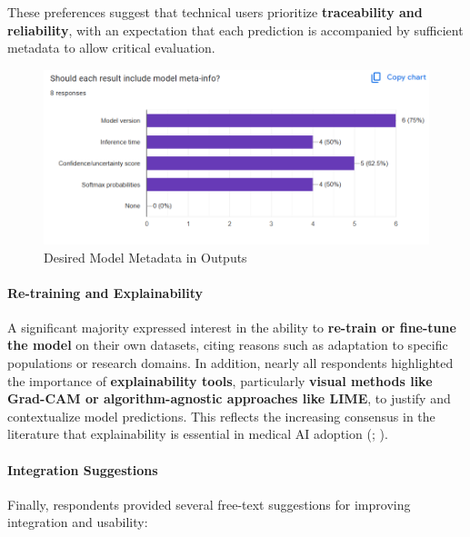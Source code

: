 \documentclass[
  12pt,
  oneside]{article}
\begin{document}
These preferences suggest that technical users prioritize
\textbf{traceability and reliability}, with an expectation that each
prediction is accompanied by sufficient metadata to allow critical
evaluation.

\begin{figure}

{\centering \includegraphics[width=1\linewidth]{technical-user-chart8} 

}

\caption{Desired Model Metadata in Outputs}\label{fig:unnamed-chunk-13}
\end{figure}

\paragraph{Re-training and
Explainability}\label{re-training-and-explainability}

A significant majority expressed interest in the ability to
\textbf{re-train or fine-tune the model} on their own datasets, citing
reasons such as adaptation to specific populations or research domains.
In addition, nearly all respondents highlighted the importance of
\textbf{explainability tools}, particularly \textbf{visual methods like
Grad-CAM or algorithm-agnostic approaches like LIME}, to justify and
contextualize model predictions. This reflects the increasing consensus
in the literature that explainability is essential in medical AI
adoption (;
).

\paragraph{Integration Suggestions}\label{integration-suggestions}

Finally, respondents provided several free-text suggestions for
improving integration and usability:
\end{document}
